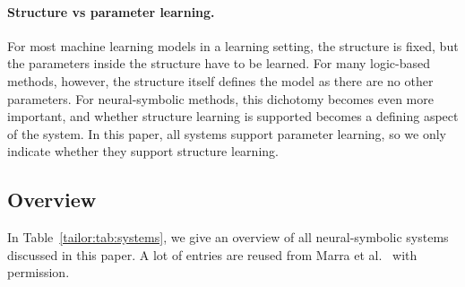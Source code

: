 \paragraph{Structure vs parameter learning. }
For most machine learning models in a learning setting, the structure is fixed, but the parameters inside the structure have to be learned. For many logic-based methods, however, the structure itself defines the model as there are no other parameters. For neural-symbolic methods, this dichotomy becomes even more important, and whether structure learning is supported becomes a defining aspect of the system. In this paper, all systems support parameter learning, so we only indicate whether they support structure learning.

\subsection{Overview}
In Table~\ref{tailor:tab:systems}, we give an overview of all neural-symbolic systems discussed in this paper. A lot of entries are reused from Marra et al.~\cite{marra2024statistical} with permission.

